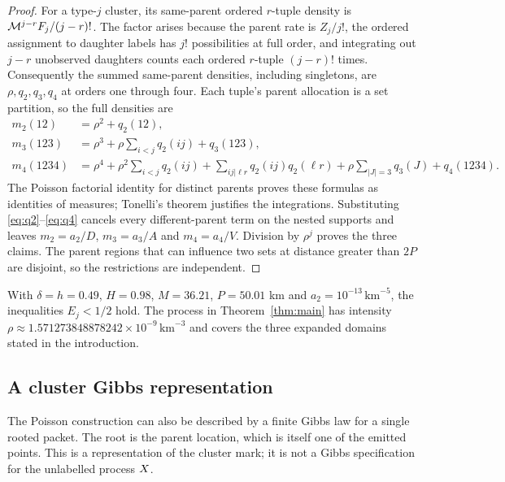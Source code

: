 \begin{proof}
For a type-$j$ cluster, its same-parent ordered $r$-tuple density is $\mathcal M^{j-r}F_j/(j-r)!$. The factor arises because the parent rate is $Z_j/j!$, the ordered assignment to daughter labels has $j!$ possibilities at full order, and integrating out $j-r$ unobserved daughters counts each ordered $r$-tuple $(j-r)!$ times. Consequently the summed same-parent densities, including singletons, are $\rho,q_2,q_3,q_4$ at orders one through four. Each tuple's parent allocation is a set partition, so the full densities are
\begin{align}
 m_2(12)&=\rho^2+q_2(12),\\
 m_3(123)&=\rho^3+\rho\sum_{i<j}q_2(ij)+q_3(123),\\
 m_4(1234)&=\rho^4+\rho^2\sum_{i<j}q_2(ij)
 +\sum_{ij|\ell r}q_2(ij)q_2(\ell r)+\rho\sum_{|J|=3}q_3(J)+q_4(1234).
 \label{eq:full-partitions}
\end{align}
The Poisson factorial identity for distinct parents proves these formulas as identities of measures; Tonelli's theorem justifies the integrations. Substituting \eqref{eq:q2}--\eqref{eq:q4} cancels every different-parent term on the nested supports and leaves $m_2=a_2/D$, $m_3=a_3/A$ and $m_4=a_4/V$. Division by $\rho^j$ proves the three claims. The parent regions that can influence two sets at distance greater than $2P$ are disjoint, so the restrictions are independent.
\end{proof}

\begin{corollary}
With $\delta=h=0.49$, $H=0.98$, $M=36.21$, $P=50.01$ km and $a_2=10^{-13}\,\mathrm{km}^{-5}$, the inequalities $E_j<1/2$ hold. The process in Theorem~\ref{thm:main} has intensity $\rho\approx1.571273848878242\times10^{-9}\,\mathrm{km}^{-3}$ and covers the three expanded domains stated in the introduction.
\end{corollary}

\subsection{A cluster Gibbs representation}
\label{sec:gibbs}

The Poisson construction can also be described by a finite Gibbs law for a single rooted packet. The root is the parent location, which is itself one of the emitted points. This is a representation of the cluster mark; it is not a Gibbs specification for the unlabelled process $X$.

